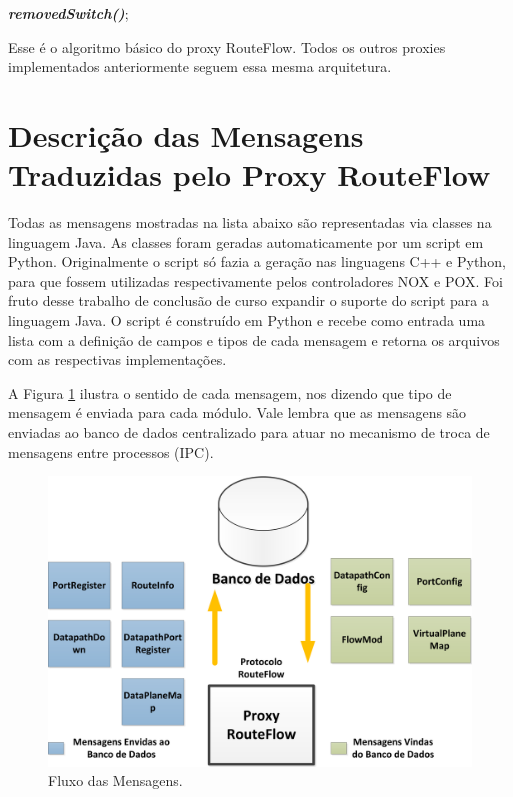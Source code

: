 \noindent
{}
\newline
\textit{\textbf{removedSwitch()}};
\newline


Esse é o algoritmo básico do proxy RouteFlow. Todos os outros 
proxies implementados anteriormente seguem essa mesma
arquitetura.

\section{Descrição das Mensagens Traduzidas pelo Proxy RouteFlow}

Todas as mensagens mostradas na lista abaixo são representadas
via classes na linguagem Java. As classes foram geradas
automaticamente por um script em Python. Originalmente
o script só fazia a geração nas linguagens C++ e Python,
para que fossem utilizadas respectivamente pelos controladores
NOX e POX. Foi fruto desse trabalho de conclusão de curso
expandir o suporte do script para a linguagem Java. O script
é construído em Python e recebe como entrada uma lista com
a definição de campos e tipos de cada mensagem e retorna
os arquivos com as respectivas implementações. 

A Figura \ref{fig:mensagens}
ilustra o sentido de cada mensagem, nos dizendo que tipo de mensagem
é enviada para cada módulo. Vale lembra que as mensagens
são enviadas ao banco de dados centralizado para atuar no
mecanismo de troca de mensagens entre processos (IPC).
\newline

\begin{figure}[h] 
\centering
\includegraphics[width=140mm]{mensagens.png}
\caption{Fluxo das Mensagens.}
\label{fig:mensagens} 
\end{figure}

